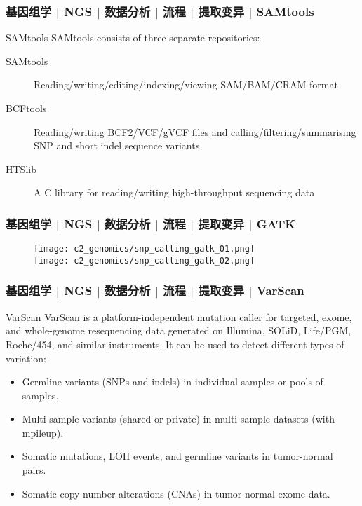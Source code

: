 \begin{frame}
  \frametitle{基因组学 | NGS | 数据分析 | 流程 | 提取变异 | SAMtools}
  \begin{block}{SAMtools}
    SAMtools consists of three separate repositories:
    \begin{description}
      \item[SAMtools] Reading/writing/editing/indexing/viewing SAM/BAM/CRAM format
      \item[BCFtools] Reading/writing BCF2/VCF/gVCF files and calling/filtering/summarising SNP and short indel sequence variants
      \item[HTSlib] A C library for reading/writing high-throughput sequencing data
    \end{description}
  \end{block}
\end{frame}

\begin{frame}
  \frametitle{基因组学 | NGS | 数据分析 | 流程 | 提取变异 | GATK}
  \begin{figure}
    \centering
    \texttt{[image: c2\_genomics/snp\_calling\_gatk\_01.png]}\\
    \vspace{1em}
    \texttt{[image: c2\_genomics/snp\_calling\_gatk\_02.png]}
  \end{figure}
\end{frame}

\begin{frame}
  \frametitle{基因组学 | NGS | 数据分析 | 流程 | 提取变异 | VarScan}
  \begin{block}{VarScan}
    VarScan is a platform-independent mutation caller for targeted, exome, and whole-genome resequencing data generated on Illumina, SOLiD, Life/PGM, Roche/454, and similar instruments. It can be used to detect different types of variation:
    \begin{itemize}
      \item Germline variants (SNPs and indels) in individual samples or pools of samples.
      \item Multi-sample variants (shared or private) in multi-sample datasets (with mpileup).
      \item Somatic mutations, LOH events, and germline variants in tumor-normal pairs.
      \item Somatic copy number alterations (CNAs) in tumor-normal exome data.
    \end{itemize}
  \end{block}
\end{frame}

